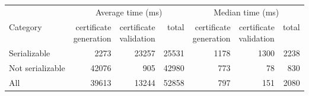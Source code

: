 \begin{table}[H]
	\centering
	\begin{tabular}{lrrrrrr}
		\toprule
		& \multicolumn{3}{c}{Average time (ms)} & \multicolumn{3}{c}{Median time (ms)} \\
		\cmidrule(lr){2-4} \cmidrule(lr){5-7}
		Category
		& \shortstack{certificate\\generation}
		& \shortstack{certificate\\validation}
		& total
		& \shortstack{certificate\\generation}
		& \shortstack{certificate\\validation}
		& total \\
		\midrule
		Serializable      &   2273 &  23257 &  25531 &  1178 &  1300 &  2238 \\
		Not serializable  &  42076 &    905 &  42980 &   773 &    78 &   830 \\
		All               &  39613 &  13244 &  52858 &   797 &   151 &  2080 \\
		\bottomrule
	\end{tabular}
\end{table}